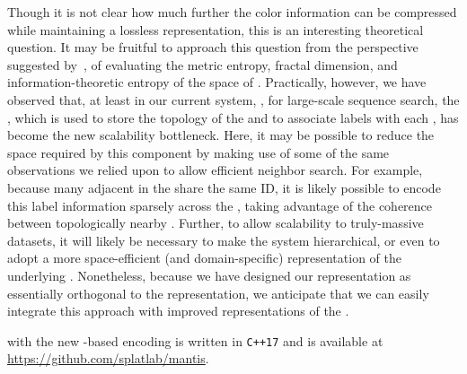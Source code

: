 Though it is not clear how much further the color information can be compressed
while maintaining a lossless representation, this is an interesting theoretical
question. It may be fruitful to approach this question from the perspective suggested
by~\citet{yu2015entropy}, of evaluating the metric entropy, fractal
dimension, and information-theoretic entropy of the space of \ccs. Practically, however,
we have observed that, at least in our current system, \mantis, for large-scale
sequence search, the \cqf, which is used to store the topology of the \dbg and
to associate \cc labels with each \kmer, has become the new scalability
bottleneck. Here, it may be possible to reduce the space required by this
component by making use of some of the same observations we relied upon to allow
efficient \cc neighbor search. For example, because many adjacent \kmers in the
\dbg share the same \cc ID, it is likely possible to encode this label
information sparsely across the \dbg, taking advantage of the coherence between
topologically nearby \kmers. Further, to allow scalability to truly-massive
datasets, it will likely be necessary to make the system hierarchical, or even
to adopt a more space-efficient (and domain-specific) representation of the
underlying \dbg. Nonetheless, because we have designed our \cc representation as
essentially orthogonal to the \dbg representation, we anticipate that we can
easily integrate this approach with improved representations of the \dbg.

\mantis with the new \mst-based \cc encoding is written in
\texttt{C++17} and is available at
\url{https://github.com/splatlab/mantis}.
